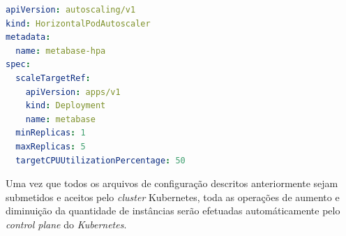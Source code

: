 \begin{lstlisting}[language=yaml]
apiVersion: autoscaling/v1
kind: HorizontalPodAutoscaler
metadata:
  name: metabase-hpa
spec:
  scaleTargetRef:
    apiVersion: apps/v1
    kind: Deployment
    name: metabase
  minReplicas: 1
  maxReplicas: 5
  targetCPUUtilizationPercentage: 50
\end{lstlisting} 

Uma vez que todos os arquivos de configuração descritos anteriormente sejam submetidos e aceitos pelo \textit{cluster} Kubernetes, toda as operações de aumento e diminuição da quantidade de instâncias serão efetuadas automáticamente pelo \textit{control plane} do \textit{Kubernetes}.  
